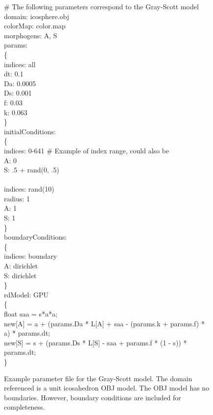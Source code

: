 \begin{figure}[p]
\LinesNotNumbered
\begin{algorithm}[H]
	\# The following parameters correspond to the Gray-Scott model \\	
	domain: icosphere.obj \\
	colorMap: color.map \\
	morphogens: A, S\\
	
	params:\\
	\{\\
\quad indices: all\\
\quad dt: 0.1\\
\quad Da: 0.0005\\
\quad Ds: 0.001\\
\quad f: 0.03\\
\quad k: 0.063\\
	\}\\
	initialConditions:\\
	\{\\
\quad indices: 0-641 \# Example of index range, could also be \\
\quad A: 0\\
\quad S: .5 + rand(0, .5)\\
\quad \\
\quad indices: rand(10)\\
\quad radius: 1\\
\quad A: 1\\
\quad S: 1\\
	\}\\
	boundaryConditions:\\
	\{\\
\quad indices: boundary \\
\quad A: dirichlet\\
\quad S: dirichlet\\
	\}\\
	rdModel: GPU\\
	\{\\
\quad float saa = s*a*a;\\
\quad new[A] = a + (params.Da * L[A] + saa - (params.k + params.f) * a) * params.dt;\\
\quad new[S] = s + (params.Ds * L[S] - saa + params.f * (1 - s)) * params.dt;\\
	\}
\end{algorithm}
	\caption[Example parameter file for the Gray-Scott model]{Example parameter file for the Gray-Scott model. The domain referenced is a unit icosahedron OBJ model. The OBJ model has no boundaries. However, boundary conditions are included for completeness.}
	\label{fig:paramFileExample}
\end{figure}

